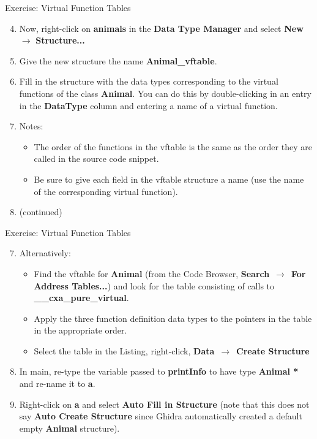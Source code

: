 \documentclass{beamer}
\begin{document}
\begin{frame}
\begin{block}{Exercise: Virtual Function Tables}
\begin{enumerate}
\setcounter{enumi}{3}
\item Now, right-click on \textbf{animals} in the \textbf{Data Type Manager} and select \textbf{New} $\rightarrow$ \textbf{Structure...}
\item Give the new structure the name \textbf{Animal\_vftable}.
\item Fill in the structure with the data types corresponding to the virtual functions of the class \textbf{Animal}.  You can do this by double-clicking in an entry in 
the \textbf{DataType} column and entering a name of a virtual function.  
\item[] Notes:
\begin{itemize}
\item The order of the functions in the vftable is the same as the order they are called in the source code snippet.
\item Be sure to give each field in the vftable structure a name (use the name of the corresponding virtual function).
\end{itemize}
\item[] (continued)
\end{enumerate}
\end{block}
\end{frame}

\begin{frame}
\begin{block}{Exercise: Virtual Function Tables}
\begin{enumerate}
\setcounter{enumi}{6}
\item Alternatively:
\begin{itemize}
\item Find the vftable for \textbf{Animal} (from the Code Browser, \textbf{Search}~$\rightarrow$~\textbf{For Address Tables...}) and look for the table consisting of calls to 
\textbf{\_\_cxa\_pure\_virtual}.
\item Apply the three function definition data types to the pointers in the table in the appropriate order.
\item Select the table in the Listing, right-click, \textbf{Data}~$\rightarrow$~\textbf{Create Structure}
\end{itemize}
\item In main, re-type the variable passed to \textbf{printInfo} to have type \textbf{Animal *} and re-name it to \textbf{a}.
\item Right-click on \textbf{a} and select \textbf{Auto Fill in Structure} (note that this does not say \textbf{Auto Create Structure} since Ghidra automatically created a default empty
\textbf{Animal} structure).
\end{enumerate}
\end{block}
\end{frame}
\end{document}
